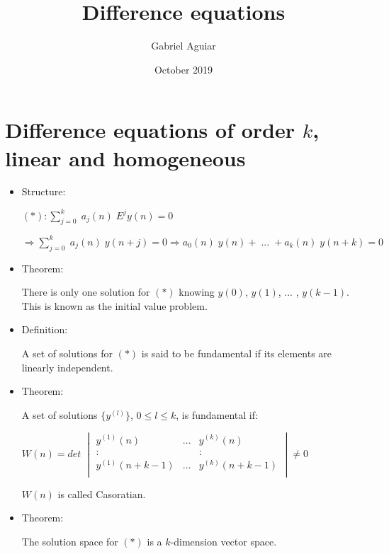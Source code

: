 \documentclass{article}
\title{Difference equations}
\author{Gabriel Aguiar}
\date{October 2019}
\begin{document}
\maketitle

\section{Difference equations of order $k$, linear and homogeneous}

\begin{itemize}

\item Structure:

$(*): \sum\limits_{j = 0}^{k} \; a_{j} (n)\; E^{j} y(n) = 0$

$\Rightarrow \sum\limits_{j = 0}^{k} \; a_{j} (n)\; y(n + j) = 0 \Rightarrow a_{0} (n) \; y(n) + \; ... \; + a_{k} (n) \; y(n + k) = 0$

\item Theorem:

There is only one solution for $(*)$ knowing $y(0)$, $y(1)$, ... , $y(k - 1)$. This is known as the initial value problem.

\item Definition:

A set of solutions for $(*)$ is said to be fundamental if its elements are linearly independent.

\item Theorem:

A set of solutions $ \{ y^{(l)} \}$, $0 \leq l \leq k$, is fundamental if:

\hfill

$W(n) = det \; \begin{vmatrix} y^{(1)} (n) & ... & y^{(k)} (n) \\ : &  & : \\ y^{(1)} (n + k - 1) & ... & y^{(k)} (n + k - 1) \\ \end{vmatrix} \neq 0$

\hfill

$W(n)$ is called Casoratian.

\item Theorem:

The solution space for $(*)$ is a $k$-dimension vector space.
    
\end{itemize}

\hfill

\hfill
\end{document}
